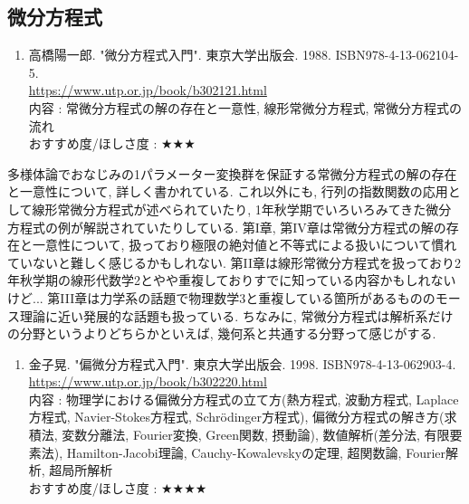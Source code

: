 \documentclass[10pt,a4paper]{jsarticle}
\begin{document}
\subsection{微分方程式}
    \begin{enumerate}
        \renewcommand{\theenumi}{[DE\arabic{enumi}]}
        \renewcommand{\labelenumi}{\theenumi}
        \setcounter{enumi}{0}
        \item \label{TYDE} 高橋陽一郎. "微分方程式入門". 東京大学出版会. 1988. ISBN978-4-13-062104-5. \\
        \url{https://www.utp.or.jp/book/b302121.html} \\
        内容 : 常微分方程式の解の存在と一意性, 線形常微分方程式, 常微分方程式の流れ\\
        おすすめ度/ほしさ度 : $\bigstar \bigstar \bigstar $
    \end{enumerate}\par 
    多様体論でおなじみの1パラメーター変換群を保証する常微分方程式の解の存在と一意性について, 詳しく書かれている. これ以外にも, 行列の指数関数の応用として線形常微分方程式が述べられていたり, 1年秋学期でいろいろみてきた微分方程式の例が解説されていたりしている. 第I章, 第IV章は常微分方程式の解の存在と一意性について, 扱っており極限の絶対値と不等式による扱いについて慣れていないと難しく感じるかもしれない. 第II章は線形常微分方程式を扱っており2年秋学期の線形代数学2とやや重複しておりすでに知っている内容かもしれないけど... 第III章は力学系の話題で物理数学3と重複している箇所があるもののモース理論に近い発展的な話題も扱っている. ちなみに, 常微分方程式は解析系だけの分野というよりどちらかといえば, 幾何系と共通する分野って感じがする. 
    \begin{enumerate}
        \renewcommand{\theenumi}{[DE\arabic{enumi}]}
        \renewcommand{\labelenumi}{\theenumi}
        \setcounter{enumi}{1}
        \item \label{KADE} 金子晃. "偏微分方程式入門". 東京大学出版会. 1998. ISBN978-4-13-062903-4. \\
        \url{https://www.utp.or.jp/book/b302220.html} \\
        内容 : 物理学における偏微分方程式の立て方(熱方程式, 波動方程式, Laplace方程式, Navier-Stokes方程式, Schrödinger方程式), 偏微分方程式の解き方(求積法, 変数分離法, Fourier変換, Green関数, 摂動論), 数値解析(差分法, 有限要素法), Hamilton-Jacobi理論, Cauchy-Kowalevskyの定理, 超関数論, Fourier解析, 超局所解析\\
        おすすめ度/ほしさ度 : $\bigstar \bigstar \bigstar \bigstar $
    \end{enumerate}\par 
\end{document}
